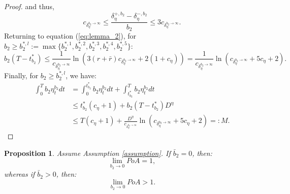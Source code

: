 \documentclass[11pt]{article}
\newtheorem{proposition}{Proposition}
\begin{document}
\begin{proof}
	and thus,
	$$c_{\delta_\eta^{b_2 \to \infty}} \leq \frac{\delta^{+,b_2}_\eta-\delta^{-,b_2}_\eta}{b_2} \leq 3c_{\delta_\eta^{b_2 \to \infty}}.$$	
	Returning to equation (\ref{eq:lemma_2}), for $b_2 \geq b_2^{*,l}:=\max \{b_2^{*,1},b_2^{*,2},b_2^{*,3},b_2^{*,4},b_2^{*,5}\}$:
	$$ b_2(T-t^*_{b_2})\leq \frac{1}{c_{\delta_\eta^{b_2 \to \infty}}} \ln \left(3 (r+\bar{r})c_{\delta_\eta^{b_2 \to \infty}}+2(1+c_\eta) \right)=\frac{1}{c_{\delta_\eta^{b_2 \to \infty}}} \ln \left( c_{\delta_\eta^{b_2 \to \infty}}+5c_\eta+2 \right).$$
	Finally, for $b_2 \geq b_2^{*,l}$, we have:
	\begin{equation*}
	\begin{split}
	\int_0^T b_2 \eta^{b_2}_t dt&=\int_0^{t^*_{b_2}} b_2 \eta^{b_2}_t dt+\int_{t^*_{b_2}}^T b_2 \eta^{b_2}_t dt \\
	&\leq t^*_{b_2}(c_\eta+1)+b_2 (T-t^*_{b_2})D^\eta\\
	&\leq T(c_\eta+1)+\frac{D^\eta}{c_{\delta_\eta^{b_2 \to \infty}}} \ln \left( c_{\delta_\eta^{b_2 \to \infty}}+5c_\eta+2 \right)=:M.	
	\end{split}
	\end{equation*}
\end{proof}


\begin{proposition}
	Assume Assumption \ref{assumption}. If $\bar{b}_2= 0$, then:
	\begin{equation*}
	\lim_{b_2 \to 0} PoA = 1,
	\end{equation*}
	whereas if $\bar{b}_2 > 0$, then:
	\begin{equation*}
	\lim_{b_2 \to 0} PoA > 1.
	\end{equation*}
\label{prop:b2_to_0}
\end{proposition}
\end{document}
